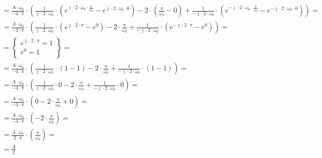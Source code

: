 \begin{task}
\begin{align*}
&=\frac{A \cdot \omega_0}{-4 \cdot \pi} \cdot \left( \frac{1}{\jmath \cdot 2 \cdot \omega_0} \cdot \left( e^{\jmath \cdot 2 \cdot \omega_0 \cdot \frac{\pi}{\omega_0}}-e^{\jmath \cdot 2 \cdot \omega_0 \cdot 0} \right) - 2 \cdot \left( \frac{\pi}{\omega_0}-0\right) +  \frac{1}{-\jmath \cdot 2 \cdot \omega_0}\cdot \left( e^{-\jmath \cdot 2 \cdot \omega_0 \cdot \frac{\pi}{\omega_0}} -e^{-\jmath \cdot 2 \cdot \omega_0 \cdot 0}\right)\right)=\\
&=\frac{A \cdot \omega_0}{-4 \cdot \pi} \cdot \left( \frac{1}{\jmath \cdot 2 \cdot \omega_0} \cdot \left( e^{\jmath \cdot 2 \cdot \pi}-e^{0} \right) - 2 \cdot \frac{\pi}{\omega_0} +  \frac{1}{-\jmath \cdot 2 \cdot \omega_0}\cdot \left( e^{-\jmath \cdot 2 \cdot \pi} -e^{0}\right)\right)=\\
&=\begin{Bmatrix}
  e^{\jmath \cdot 2 \cdot \pi} = 1\\
  e^{0} = 1\\
\end{Bmatrix}=\\
&=\frac{A \cdot \omega_0}{-4 \cdot \pi} \cdot \left( \frac{1}{\jmath \cdot 2 \cdot \omega_0} \cdot \left( 1-1 \right) - 2 \cdot \frac{\pi}{\omega_0} +  \frac{1}{-\jmath \cdot 2 \cdot \omega_0}\cdot \left( 1 -1\right)\right)=\\
&=\frac{A \cdot \omega_0}{-4 \cdot \pi} \cdot \left( \frac{1}{\jmath \cdot 2 \cdot \omega_0} \cdot 0 - 2 \cdot \frac{\pi}{\omega_0} +  \frac{1}{-\jmath \cdot 2 \cdot \omega_0}\cdot 0\right)=\\
&=\frac{A \cdot \omega_0}{-4 \cdot \pi} \cdot \left( 0 - 2 \cdot \frac{\pi}{\omega_0} + 0\right)=\\
&=\frac{A \cdot \omega_0}{-4 \cdot \pi} \cdot \left(- 2 \cdot \frac{\pi}{\omega_0}\right)=\\
&=\frac{A \cdot \omega_0}{2 \cdot \pi} \cdot \left(\frac{\pi}{\omega_0}\right)=\\
&=\frac{A }{2 }
\end{align*}

\end{task}